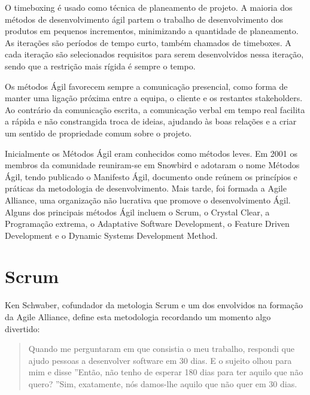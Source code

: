 O timeboxing é usado como técnica de planeamento de projeto. A maioria dos métodos de desenvolvimento ágil partem o trabalho de desenvolvimento dos produtos em pequenos incrementos, minimizando a quantidade de planeamento. As iterações são períodos de tempo curto, também chamados de timeboxes. A cada iteração são selecionados requisitos para serem desenvolvidos nessa iteração, sendo que a restrição mais rígida é sempre o tempo.


Os métodos Ágil favorecem sempre a comunicação presencial, como forma de manter uma ligação próxima entre a equipa, o cliente e os restantes stakeholders. Ao contrário da comunicação escrita, a comunicação verbal em tempo real facilita a rápida e não constrangida troca de ideias, ajudando às boas relações e a criar um sentido de propriedade comum sobre o projeto.

Inicialmente os Métodos Ágil eram conhecidos como métodos leves. Em 2001 os membros da comunidade reuniram-se em Snowbird e adotaram o nome Métodos Ágil, tendo publicado o Manifesto Ágil, documento onde reúnem os princípios e práticas da metodologia de desenvolvimento. Mais tarde, foi formada a Agile Alliance, uma organização não lucrativa que promove o desenvolvimento Ágil. 
Alguns dos principais métodos Ágil incluem o Scrum, o Crystal Clear, a Programação extrema, o Adaptative Software Development, o Feature Driven Development e o Dynamic Systems Development Method.

\newpage

\section{Scrum}

Ken Schwaber, cofundador da metologia Scrum e um dos envolvidos na formação da Agile Alliance, define esta metodologia recordando um momento algo divertido:

\begin{quote}
Quando me perguntaram em que consistia o meu trabalho, respondi que ajudo pessoas a desenvolver software em 30 dias. E o sujeito olhou para mim e disse ”Então, não tenho de esperar 180 dias para ter aquilo que não quero? ”Sim, exatamente, nós damos-lhe aquilo que não quer em 30 dias.
\end{quote}

